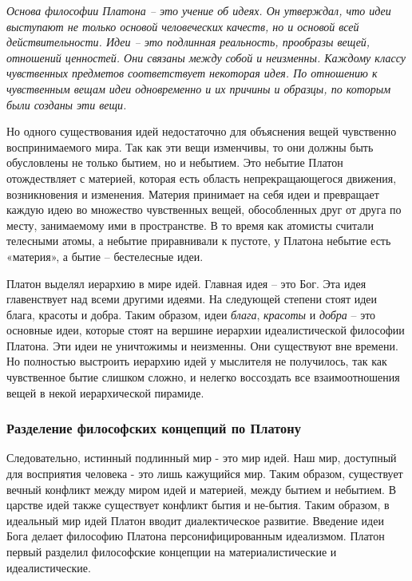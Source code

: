 \documentclass[
]{article}
\begin{document}
\emph{Основа философии Платона -- это учение об идеях. Он утверждал, что
идеи выступают не только основой человеческих качеств, но и основой всей
действительности. Идеи -- это подлинная реальность, прообразы вещей,
отношений ценностей. Они связаны между собой и неизменны. Каждому классу
чувственных предметов соответствует некоторая идея. По отношению к
чувственным вещам идеи одновременно и их причины и образцы, по которым
были созданы эти вещи.}

Но одного существования идей недостаточно для объяснения вещей
чувственно воспринимаемого мира. Так как эти вещи изменчивы, то они
должны быть обусловлены не только бытием, но и небытием. Это небытие
Платон отождествляет с материей, которая есть область непрекращающегося
движения, возникновения и изменения. Материя принимает на себя идеи и
превращает каждую идею во множество чувственных вещей, обособленных друг
от друга по месту, занимаемому ими в пространстве. В то время как
атомисты считали телесными атомы, а небытие приравнивали к пустоте, у
Платона небытие есть «материя», а бытие -- бестелесные идеи.

Платон выделял иерархию в мире идей. Главная идея -- это Бог. Эта идея
главенствует над всеми другими идеями. На следующей степени стоят идеи
блага, красоты и добра. Таким образом, идеи \emph{блага}, \emph{красоты}
и \emph{добра} -- это основные идеи, которые стоят на вершине иерархии
идеалистической философии Платона. Эти идеи не уничтожимы и неизменны.
Они существуют вне времени. Но полностью выстроить иерархию идей у
мыслителя не получилось, так как чувственное бытие слишком сложно, и
нелегко воссоздать все взаимоотношения вещей в некой иерархической
пирамиде.

\hypertarget{ux440ux430ux437ux434ux435ux43bux435ux43dux438ux435-ux444ux438ux43bux43eux441ux43eux444ux441ux43aux438ux445-ux43aux43eux43dux446ux435ux43fux446ux438ux439-ux43fux43e-ux43fux43bux430ux442ux43eux43dux443}{%
\subsubsection{Разделение философских концепций по
Платону}\label{ux440ux430ux437ux434ux435ux43bux435ux43dux438ux435-ux444ux438ux43bux43eux441ux43eux444ux441ux43aux438ux445-ux43aux43eux43dux446ux435ux43fux446ux438ux439-ux43fux43e-ux43fux43bux430ux442ux43eux43dux443}}

Следовательно, истинный подлинный мир - это мир идей. Наш мир, доступный
для восприятия человека - это лишь кажущийся мир. Таким образом,
существует вечный конфликт между миром идей и материей, между бытием и
небытием. В царстве идей также существует конфликт бытия и не-бытия.
Таким образом, в идеальный мир идей Платон вводит диалектическое
развитие. Введение идеи Бога делает философию Платона
персонифицированным идеализмом. Платон первый разделил философские
концепции на материалистические и идеалистические.
\end{document}
